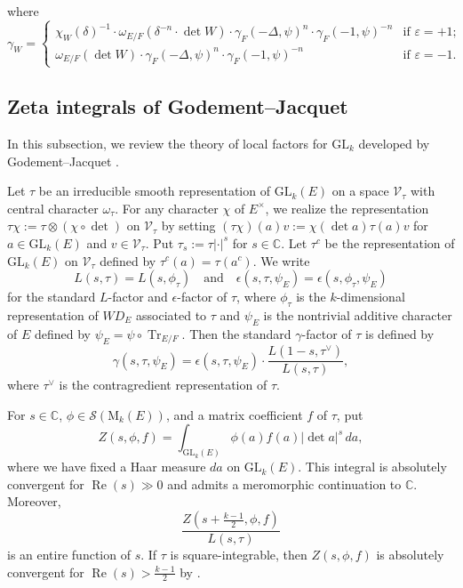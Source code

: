 \documentclass[11pt]{amsart}
\numberwithin{equation}{section}
\theoremstyle{plain}
\theoremstyle{definition}
\theoremstyle{remark}
\def\Re{\operatorname{Re}}
\def\Tr{\operatorname{Tr}}
\def\GL{\mathrm{GL}}
\def\WD{\mathit{WD}}
\def\CC{\mathbb{C}}
\def\s{\mathscr{S}}
\def\V{\mathscr{V}}
\begin{document}
where 
\[
 \gamma_W = 
 \begin{cases}
  \chi_W(\delta)^{-1} \cdot \omega_{E/F}(\delta^{-n} \cdot \det W) \cdot \gamma_F(-\Delta, \psi)^n \cdot \gamma_F(-1,\psi)^{-n}
  & \text{if $\varepsilon = +1$;} \\
  \omega_{E/F}(\det W) \cdot \gamma_F(-\Delta, \psi)^n \cdot \gamma_F(-1,\psi)^{-n}
  & \text{if $\varepsilon = -1$.}
 \end{cases}
\]

\subsection{Zeta integrals of Godement--Jacquet}

In this subsection, we review the theory of local factors for $\GL_k$ developed by Godement--Jacquet \cite{gj}.

Let $\tau$ be an irreducible smooth representation of $\GL_k(E)$ on a space $\V_{\tau}$ with central character $\omega_{\tau}$.
For any character $\chi$ of $E^{\times}$, we realize the representation $\tau \chi := \tau \otimes (\chi \circ \det)$ on $\V_{\tau}$ by setting $(\tau \chi)(a) v := \chi(\det a) \tau(a) v$ for $a \in \GL_k(E)$ and $v \in \V_{\tau}$. Put $\tau_s := \tau |\cdot|^s$ for $s \in \CC$.
Let $\tau^c$ be the representation of $\GL_k(E)$ on $\V_{\tau}$ defined by $\tau^c(a) = \tau(a^c)$.
We write 
\[
 L(s, \tau) = L(s, \phi_\tau) \quad \text{and} \quad
 \epsilon(s, \tau, \psi_E) =  \epsilon(s, \phi_\tau, \psi_E)
\]
for the standard $L$-factor and $\epsilon$-factor of $\tau$, where $\phi_\tau$ is the $k$-dimensional representation of $\WD_E$ associated to $\tau$ and $\psi_E$ is the nontrivial additive character of $E$ defined by $\psi_E = \psi \circ \Tr_{E/F}$.
Then the standard $\gamma$-factor of $\tau$ is defined by
\[
 \gamma(s, \tau, \psi_E) = \epsilon(s, \tau, \psi_E) \cdot \frac{L(1-s, \tau^\vee)}{L(s, \tau)},
\]
where $\tau^\vee$ is the contragredient representation of $\tau$.

For $s \in \CC$, $\phi \in \s(\mathrm{M}_k(E))$, and a matrix coefficient $f$ of $\tau$, put
\[
 Z(s, \phi, f) =  \int_{\GL_k(E)} \phi(a) f(a) |\det a|^s \, da,
\]
where we have fixed a Haar measure $da$ on $\GL_k(E)$.
This integral is absolutely convergent for $\Re(s) \gg 0$ and admits a meromorphic continuation to $\CC$.
Moreover, 
\[
 \frac{Z(s+\frac{k-1}{2}, \phi, f)}{L(s,\tau)}
\]
is an entire function of $s$.
If $\tau$ is square-integrable, then $Z(s, \phi, f)$ is absolutely convergent for $\Re(s) > \frac{k-1}{2}$ by \cite[Proposition 1.3]{gj}.
\end{document}
